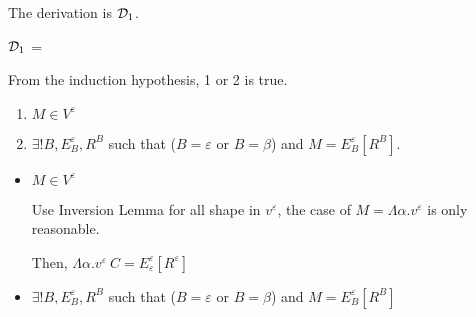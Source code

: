 \begin{itemize}
\begin{itemize}
	      	      The derivation is $\mathcal{D}_1$.
	      	      	      	      	      	      	      	      	      	      	      	      	      	      	      	      	      	      	      	      		      	      	      	      	      	      	      	      
	      	      $\mathcal{D}_1$ = 
	      	      {}
	      	      	      	      	      	      	      	      	      	      	      	      	      	      	      	      	      	      	      	      		      	      	      	      	      	      	      	      
	      	      From the induction hypothesis, 1 or 2 is true.
	      	      	      	      	      	      	      	      	      	      	      	      	      	      	      	      	      	      	      	      		      	      	      	      	      	      	      	      
	      	      \begin{enumerate}
	      	      	\item $ M \in V^\varepsilon$
	      	      	\item $\exists ! B, E^\varepsilon_B, R^B$ such that ($B = \varepsilon$ or $B = \beta$) and $M = E^\varepsilon_B[R^B]$.
	      	      \end{enumerate}
	      	      	      	      	      	      	      	      	      	      	      	      	      	      	      	      	      	      	      	      		      	      	      	      	      	      	      	      
	      	      \begin{itemize}
	      	      	\item $ M \in V^\varepsilon$
	      	      	      	      	      	      	      	      	      	      	      	      	      	      	      	      	      	      	      	      	      	      	      	      	      	      	      	      	      	      		      	      	      	      	      	      	      	      	      	      	      	      
	      	      	      Use Inversion Lemma for all shape in $v^\varepsilon$, the case of $ M = \Lambda\alpha.v^\varepsilon$ is only reasonable.
	      	      	      	      	      	      	      	      	      	      	      	      	      	      	      	      	      	      	      	      	      	      	      	      	      	      	      	      	      	      		      	      	      	      	      	      	      	      	      	      	      	      
	      	      	      Then, $ \Lambda\alpha.v^\varepsilon\ C = E^\varepsilon_\varepsilon [R^\varepsilon]$
	      	      	\item $\exists ! B, E^\varepsilon_B, R^B$ such that ($B = \varepsilon$ or $B = \beta$) and $M = E^\varepsilon_B[R^B]$
	      	      	      	      	      	      	      	      	      	      	      	      	      	      	      	      	      	      	      	      	      	      	      	      	      	      	      	      	      	      		      	      	      	      	      	      	      	      	      	      	      	      

\end{itemize}
\end{itemize}
\end{itemize}
